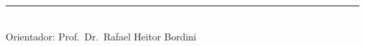 \documentclass[12pt]{sa}
\begin{document}
%


	\vfill

   \begin{center}
		\rule{8cm}{.1mm} \\ Orientador: Prof.~Dr.~Rafael Heitor Bordini
    \end{center}
\end{document}
